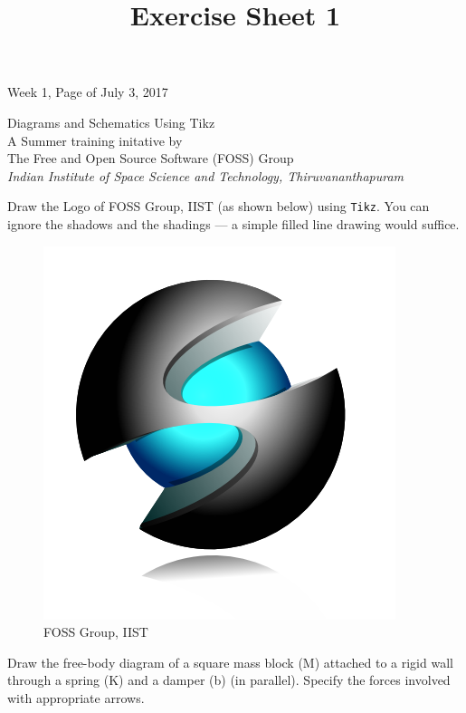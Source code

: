 \documentclass[12pt,final]{exam}
\title{Exercise Sheet 1}
\begin{document}


\pagestyle{headandfoot}
\runningheadrule
{}
{Week 1, Page \thepage of \numpages}
{July 3, 2017}
\firstpagefooter{}{}{}
\runningfooter{}{}{}

\begin{center}
  {\LARGE Diagrams and Schematics Using Tikz}\\
  {\large A Summer training initative by\\
    The Free and Open Source Software (FOSS) Group\\
    \emph{Indian Institute of Space Science and Technology, Thiruvananthapuram}}\\
  \vspace{10pt}
\end{center}

\begin{questions}
\question{} Draw the Logo of FOSS Group, IIST (as shown below) using
  \texttt{Tikz}. You can ignore the shadows and the shadings --- a
  simple filled line drawing would suffice. 
  \begin{figure}[!ht]
    \centering
    \includegraphics[width=.3\linewidth]{FOSSgroupLogo}
    \caption{FOSS Group, IIST}
    \label{fig:fossgrouplogo}
  \end{figure}
  
\question{} Draw the free-body diagram of a square mass block (M)
  attached to a rigid wall through a spring (K) and a damper (b) (in
  parallel). Specify the forces involved with appropriate arrows.
\end{questions}
\end{document}
